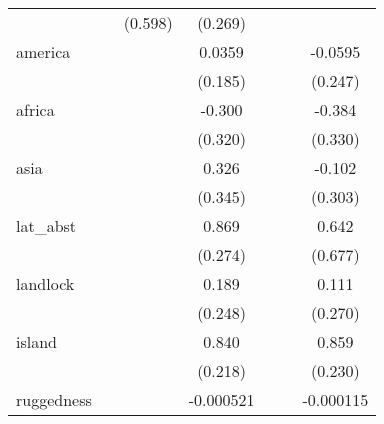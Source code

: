 {\begin{tabular}{l*{6}{c}}
            &                     &     (0.598)         &     (0.269)         &                     &                     &                     \\
[1em]
america     &                     &                     &      0.0359         &                     &                     &     -0.0595         \\
            &                     &                     &     (0.185)         &                     &                     &     (0.247)         \\
[1em]
africa      &                     &                     &      -0.300         &                     &                     &      -0.384         \\
            &                     &                     &     (0.320)         &                     &                     &     (0.330)         \\
[1em]
asia        &                     &                     &       0.326         &                     &                     &      -0.102         \\
            &                     &                     &     (0.345)         &                     &                     &     (0.303)         \\
[1em]
lat\_abst    &                     &                     &       0.869\sym{**} &                     &                     &       0.642         \\
            &                     &                     &     (0.274)         &                     &                     &     (0.677)         \\
[1em]
landlock    &                     &                     &       0.189         &                     &                     &       0.111         \\
            &                     &                     &     (0.248)         &                     &                     &     (0.270)         \\
[1em]
island      &                     &                     &       0.840\sym{**} &                     &                     &       0.859\sym{***}\\
            &                     &                     &     (0.218)         &                     &                     &     (0.230)         \\
[1em]
ruggedness  &                     &                     &   -0.000521         &                     &                     &   -0.000115         \\

\end{tabular}}
